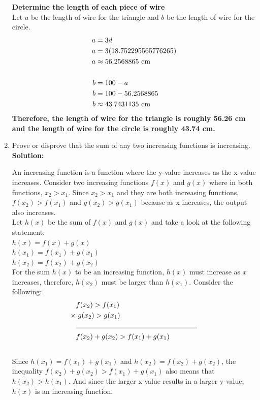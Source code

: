 \documentclass[12pt]{book}
\begin{document}
\begin{enumerate}
\textbf{Determine the length of each piece of wire}\\
Let $a$ be the length of wire for the triangle and $b$ be the length of wire for the circle.
\begin{align*}
    a &= 3d\\
    a &= 3(18.752295565776265)\\
    a &\approx 56.2568865 \text{ cm}\\
    &\hrulefill\\
    b &= 100 - a\\
    b &= 100 - 56.2568865\\
    b &\approx 43.7431135 \text{ cm}
\end{align*}
\textbf{Therefore, the length of wire for the triangle is roughly 56.26 cm and the length of wire for the circle is roughly 43.74 cm.}
\newpage

\item Prove or disprove that the sum of any two increasing functions is increasing.\\

\textbf{Solution:}

An increasing function is a function where the y-value increases as the x-value increases. Consider two increasing functions $f(x)$ and $g(x)$ where in both functions, $x_2 > x_1$. Since $x_2 > x_1$ and they are both increasing functions, $f(x_2) > f(x_1)$ and $g(x_2) > g(x_1)$ because as x increases, the output also increases.\\

Let $h(x)$ be the sum of $f(x)$ and $g(x)$ and take a look at the following statement:\\

$h(x) = f(x) + g(x)$\\
$h(x_1) = f(x_1) + g(x_1)$\\
$h(x_2) = f(x_2) + g(x_2)$\\

For the sum $h(x)$ to be an increasing function, $h(x)$ must increase as $x$ increases, therefore, $h(x_2)$ must be larger than $h(x_1)$. Consider the following:
\setcounter{equation}{0}
\begin{align*}
    &f(x_2) > f(x_1)\MoveEqLeft[1]\\
    \times &\hspace{0.1cm} g(x_2) > g(x_1)\\
    &\noindent\rule{6cm}{0.4pt}\\
    &f(x_2) + g(x_2) > f(x_1) + g(x_1)
\end{align*}\\
Since $h(x_1) = f(x_1) + g(x_1)$ and $h(x_2) = f(x_2) + g(x_2)$, the inequality $f(x_2) + g(x_2) > f(x_1) + g(x_1)$ also means that $h(x_2) > h(x_1)$. And since the larger x-value results in a larger y-value, $h(x)$ is an increasing function.\\


\end{enumerate}
\end{document}
